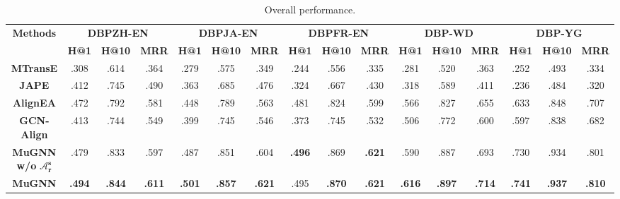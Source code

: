 \documentclass[11pt,a4paper]{article}
\begin{document}
\begin{table*}[htbp]
	\centering
	\small
	\setlength{\tabcolsep}{2.0pt}
	\begin{tabular}{cccccccccccccccc}
		\toprule
		\multirow{2}[4]{*}{\textbf{Methods}} & \multicolumn{3}{c}{\textbf{DBP\tiny{ZH-EN}}} & \multicolumn{3}{c}{\textbf{DBP\tiny{JA-EN}}} & \multicolumn{3}{c}{\textbf{DBP\tiny{FR-EN}}} & \multicolumn{3}{c}{\textbf{DBP-WD}} & \multicolumn{3}{c}{\textbf{DBP-YG}} \\
		\cmidrule{2-16}             & \textbf{H@1}            & \textbf{H@10}          & \textbf{MRR}            & \textbf{H@1}            & \textbf{H@10}           & \textbf{MRR}            & \textbf{H@1}            & \textbf{H@10}           & \textbf{MRR}      & \textbf{H@1}            & \textbf{H@10}           & \textbf{MRR}            & \textbf{H@1}            & \textbf{H@10}           & \textbf{MRR}            \\
		\midrule
		\textbf{MTransE}                     & .308          & .614          & .364          & .279          & .575          & .349          & .244          & .556          & .335          & .281          & .520          & .363          & .252          & .493          & .334          \\
		\textbf{JAPE}                        & .412          & .745          & .490          & .363          & .685          & .476          & .324          & .667          & .430          & .318          & .589          & .411          & .236          & .484          & .320          \\
		\textbf{AlignEA}                     & .472          & .792          & .581          & .448          & .789          & .563          & .481          & .824          & .599          & .566          & .827          & .655          & .633          & .848          & .707          \\
		\textbf{GCN-Align}                   & .413          & .744          & .549          & .399          & .745          & .546          & .373          & .745          & .532          & .506          & .772          & .600          & .597          & .838          & .682          \\
		\midrule
		\textbf{MuGNN w/o} $\mathbf{\mathcal{A}_r^s}$ & .479          & .833          & .597          & .487          & .851          & .604          & \textbf{.496} & .869          & \textbf{.621} & .590          & .887          & .693          & .730          & .934          & .801          \\
\textbf{MuGNN}                       & \textbf{.494} & \textbf{.844} & \textbf{.611} & \textbf{.501} & \textbf{.857} & \textbf{.621} & .495          & \textbf{.870} & \textbf{.621} & \textbf{.616} & \textbf{.897} & \textbf{.714} & \textbf{.741} & \textbf{.937} & \textbf{.810} \\
		\bottomrule
	\end{tabular}\caption{Overall performance.}
	\label{tab:performance}\end{table*}
\end{document}
